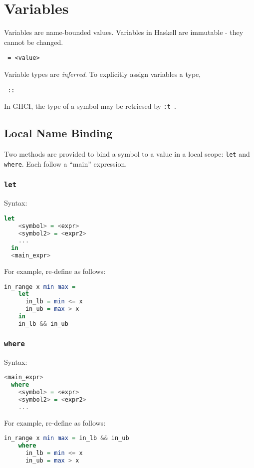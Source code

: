 \section{Variables}

Variables are name-bounded values. Variables in Haskell are immutable - they cannot be changed.

\begin{center}
  \texttt{ = <value>}
\end{center}

Variable types are \textit{inferred}. To explicitly assign variables a type,

\begin{center}
  \texttt{ :: }
\end{center}

In GHCI, the type of a symbol may be retriesed by \texttt{:t }.

\subsection{Local Name Binding}
Two methods are provided to bind a symbol to a value in a local scope: \texttt{let} and \texttt{where}. Each follow a ``main'' expression.

\subsubsection{\texttt{let}}
Syntax:
\begin{lstlisting}[language=haskell]
  let
    <symbol> = <expr>
    <symbol2> = <expr2>
    ...
  in
  <main_expr>
\end{lstlisting}

For example, re-define \texttt{} as follows:

\begin{lstlisting}[language=haskell]
  in_range x min max =
    let
      in_lb = min <= x
      in_ub = max > x
    in
    in_lb && in_ub
\end{lstlisting}

\subsubsection{\texttt{where}}
Syntax:

\begin{lstlisting}[language=haskell]
  <main_expr>
  where
    <symbol> = <expr>
    <symbol2> = <expr2>
    ...
\end{lstlisting}

For example, re-define \texttt{} as follows:

\begin{lstlisting}[language=haskell]
  in_range x min max = in_lb && in_ub
    where
      in_lb = min <= x
      in_ub = max > x
\end{lstlisting}